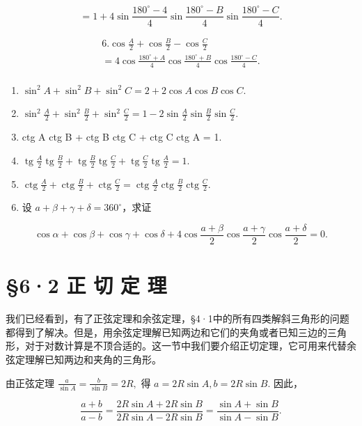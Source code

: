 \[
= 1 + 4 \sin \frac {180 ^{\circ} - 4}{4} \sin \frac {180 ^{\circ} - B}{4} \sin \frac {180 ^{\circ} - C}{4}.
\]

\[
\begin{array}{l} 6. \cos \frac {A}{2} + \cos \frac {B}{2} - \cos \frac {C}{2} \\ = 4 \cos \frac {180 ^{\circ} + A}{4} \cos \frac {180 ^{\circ} + B}{4} \cos \frac {180 ^{\circ} - C}{4}. \\ \end{array}
\]

\begin{enumerate}[start=7]
\item
  \(\sin^2 A + \sin^2 B + \sin^2 C = 2 + 2\cos A\cos B\cos C.\)
\item
  \(\sin^2\frac{A}{2} +\sin^2\frac{B}{2} +\sin^2\frac{C}{2} = 1 - 2\sin \frac{A}{2}\sin \frac{B}{2}\sin \frac{C}{2}.\)
\item
  ctg A ctg B + ctg B ctg C + ctg C ctg A = 1.
\item
  \(\operatorname{tg} \frac{A}{2} \operatorname{tg} \frac{B}{2} + \operatorname{tg} \frac{B}{2} \operatorname{tg} \frac{C}{2} + \operatorname{tg} \frac{C}{2} \operatorname{tg} \frac{A}{2} = 1.\)
\item
  \(\operatorname{ctg} \frac{A}{2} + \operatorname{ctg} \frac{B}{2} + \operatorname{ctg} \frac{C}{2} = \operatorname{ctg} \frac{A}{2} \operatorname{ctg} \frac{B}{2} \operatorname{ctg} \frac{C}{2}\).
\item
  设 \(a + \beta + \gamma + \delta = 360^\circ\)，求证
\end{enumerate}

\[
\cos \alpha + \cos \beta + \cos \gamma + \cos \delta + 4 \cos \frac {a + \beta}{2} \cos \frac {a + \gamma}{2} \cos \frac {a + \delta}{2} = 0.
\]

\section{§6·2 正 切 定 理}

我们已经看到，有了正弦定理和余弦定理，§4·1中的所有四类解斜三角形的问题都得到了解决。但是，用余弦定理解已知两边和它们的夹角或者已知三边的三角形，对于对数计算是不顶合适的。这一节中我们要介绍正切定理，它可用来代替余弦定理解已知两边和夹角的三角形。

由正弦定理 \(\frac{a}{\sin A} = \frac{b}{\sin B} = 2R,\) 得
\(a = 2R\sin A, b = 2R\sin B.\) 因此，

\[
\frac {a + b}{a - b} = \frac {2 R \sin A + 2 R \sin B}{2 R \sin A - 2 R \sin B} = \frac {\sin A + \sin B}{\sin A - \sin B}.
\]

